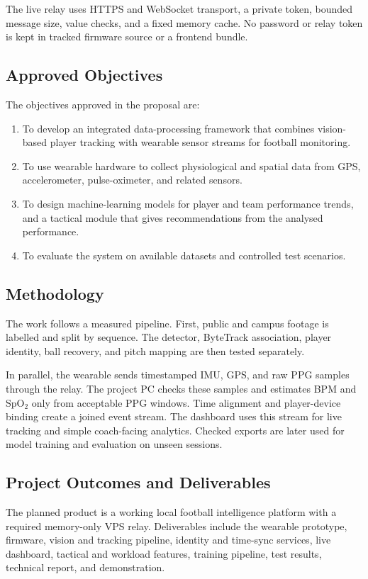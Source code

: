 The live relay uses HTTPS and WebSocket transport, a private token, bounded
message size, value checks, and a fixed memory cache. No password or relay token
is kept in tracked firmware source or a frontend bundle.

\subsection{Approved Objectives}
The objectives approved in the proposal are:

\begin{enumerate}
  \item To develop an integrated data-processing framework that combines
  vision-based player tracking with wearable sensor streams for football
  monitoring.
  \item To use wearable hardware to collect physiological and spatial data
  from GPS, accelerometer, pulse-oximeter, and related sensors.
  \item To design machine-learning models for player and team performance
  trends, and a tactical module that gives recommendations from the analysed
  performance.
  \item To evaluate the system on available datasets and controlled test
  scenarios.
\end{enumerate}

\subsection{Methodology}
The work follows a measured pipeline. First, public and campus footage is
labelled and split by sequence. The detector, ByteTrack association, player
identity, ball recovery, and pitch mapping are then tested separately.

In parallel, the wearable sends timestamped IMU, GPS, and raw PPG samples
through the relay. The project PC checks these samples and estimates BPM and
SpO$_2$ only from acceptable PPG windows. Time alignment and player-device
binding create a joined event stream. The dashboard uses this stream for live
tracking and simple coach-facing analytics. Checked exports are later used for
model training and evaluation on unseen sessions.

\subsection{Project Outcomes and Deliverables}
The planned product is a working local football intelligence platform with a
required memory-only VPS relay. Deliverables include the wearable prototype,
firmware, vision and tracking pipeline, identity and time-sync services, live
dashboard, tactical and workload features, training pipeline, test results,
technical report, and demonstration.

